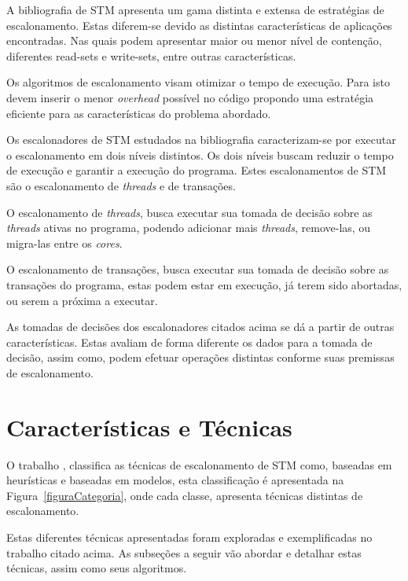 \documentclass[ti]{texufpel}
\begin{document}
 A bibliografia de STM apresenta um gama distinta e extensa de estratégias de escalonamento. Estas diferem-se devido as distintas características de aplicações encontradas. Nas quais podem apresentar maior ou menor nível de contenção, diferentes read-sets e write-sets, entre outras características.

 Os algoritmos de escalonamento visam otimizar o tempo de execução. Para isto devem inserir o menor \emph{overhead} possível no código propondo uma estratégia eficiente para as características do problema abordado.

 Os escalonadores de STM estudados na bibliografia caracterizam-se por executar o escalonamento em dois níveis distintos. Os dois níveis buscam reduzir o tempo de execução e garantir a execução do programa. Estes escalonamentos de STM são o escalonamento de \emph{threads} e de transações.

 O escalonamento de \emph{threads}, busca executar sua tomada de decisão sobre as \emph{threads} ativas no programa, podendo adicionar mais \emph{threads}, remove-las, ou migra-las entre os \emph{cores}.

 O escalonamento de transações, busca executar sua tomada de decisão sobre as transações do programa, estas podem estar em execução, já terem sido abortadas, ou serem a próxima a executar.

 As tomadas de decisões dos escalonadores citados acima se dá a partir de outras características. Estas avaliam de forma diferente os dados para a tomada de decisão, assim como, podem efetuar operações distintas conforme suas premissas de escalonamento.

\section{Características e Técnicas}

O trabalho \cite{sanzo17}, classifica as técnicas de escalonamento de STM como, baseadas em heurísticas e baseadas em modelos, esta classificação é apresentada na Figura~\ref{figuraCategoria}, onde cada classe, apresenta técnicas distintas de escalonamento.

Estas diferentes técnicas apresentadas foram exploradas e exemplificadas no trabalho citado acima. As subseções a seguir vão abordar e detalhar estas técnicas, assim como seus algoritmos.
\end{document}
